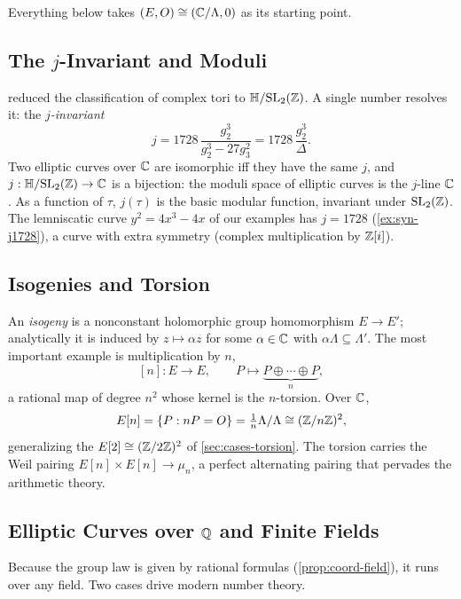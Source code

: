 Everything below takes \((E, O) \cong (\mathbb{C}/\Lambda, 0)\) as its starting point.

\subsection{The \texorpdfstring{$j$}{j}-Invariant and Moduli}
\label{sec:syn-j}

 reduced the classification of complex tori to
\(\mathbb{H} / \mathrm{SL}_2(\mathbb{Z})\). A single number resolves it: the \emph{\(j\)-invariant}
\[
  j = 1728\,\frac{g_2^3}{g_2^3 - 27 g_3^2} = 1728\,\frac{g_2^3}{\Delta}.
\]
Two elliptic curves over \(\mathbb{C}\) are isomorphic iff they have the same \(j\), and
\(j : \mathbb{H} / \mathrm{SL}_2(\mathbb{Z}) \to \mathbb{C}\) is a bijection: the moduli space of elliptic
curves is the \(j\)-line \(\mathbb{C}\). As a function of \(\tau\), \(j(\tau)\) is the
basic modular function, invariant under \(\mathrm{SL}_2(\mathbb{Z})\). The lemniscatic
curve \(y^2 = 4x^3 - 4x\) of our examples has \(j = 1728\)
(\cref{ex:syn-j1728}), a curve with extra symmetry (complex multiplication by
\(\mathbb{Z}[i]\)).

\subsection{Isogenies and Torsion}
\label{sec:syn-isogeny}

An \emph{isogeny} is a nonconstant holomorphic group homomorphism
\(E \to E'\); analytically it is induced by \(z \mapsto \alpha z\) for some
\(\alpha \in \mathbb{C}\) with \(\alpha\Lambda \subseteq \Lambda'\). The most important
example is multiplication by \(n\),
\[
  [n] : E \to E, \qquad P \mapsto \underbrace{P \oplus \cdots \oplus P}_{n},
\]
a rational map of degree \(n^2\) whose kernel is the \(n\)-torsion. Over \(\mathbb{C}\),
\[
  E[n] = \{ P : nP = O \} = \tfrac1n\Lambda / \Lambda \cong (\mathbb{Z}/n\mathbb{Z})^2 ,
\]
generalizing the \(E[2] \cong (\mathbb{Z}/2\mathbb{Z})^2\) of \cref{sec:cases-torsion}. The
torsion carries the Weil pairing \(E[n] \times E[n] \to \mu_n\), a perfect
alternating pairing that pervades the arithmetic theory.

\subsection{Elliptic Curves over \texorpdfstring{$\mathbb{Q}$}{Q} and Finite Fields}
\label{sec:syn-arithmetic}

Because the group law is given by rational formulas (\cref{prop:coord-field}), it
runs over any field. Two cases drive modern number theory.

